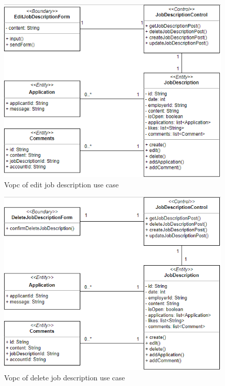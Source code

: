 \documentclass[a4paper]{article}
\begin{document}
    \begin{figure}[H]
        \centering
        \includegraphics[width=1.0\textwidth]{vopc_edit_jd.png}
        \caption{Vopc of edit job description use case}
        \label{fig:fig28}
    \end{figure}

    \begin{figure}[H]
        \centering
        \includegraphics[width=1.0\textwidth]{vopc_del_jd.png}
        \caption{Vopc of delete job description use case}
        \label{fig:fig29}
    \end{figure}
\end{document}
